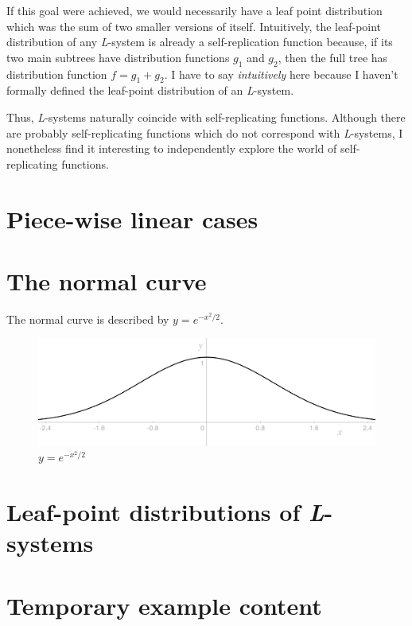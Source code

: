 \documentclass[]{article}
\begin{document}
If this goal were achieved, we would necessarily have a leaf point
distribution which was the sum of two smaller versions of itself.
Intuitively, the leaf-point distribution of any \emph{L}-system is
already a self-replication function because, if its two main subtrees
have distribution functions \(g_1\) and \(g_2\), then the full tree has
distribution function \(f = g_1 + g_2\). I have to say
\emph{intuitively} here because I haven't formally defined the
leaf-point distribution of an \emph{L}-system.

Thus, \emph{L}-systems naturally coincide with self-replicating
functions. Although there are probably self-replicating functions which
do not correspond with \emph{L}-systems, I nonetheless find it
interesting to independently explore the world of self-replicating
functions.

\section{Piece-wise linear cases}\label{piece-wise-linear-cases}

\section{The normal curve}\label{the-normal-curve}

The normal curve is described by \(y = e^{-x^2/2}\).

\begin{figure}[htbp]
\centering
\includegraphics{images/normal@2x.png}
\caption{\(y=e^{-x^2/2}\)}
\end{figure}

\section{\texorpdfstring{Leaf-point distributions of
\emph{L}-systems}{Leaf-point distributions of L-systems}}\label{leaf-point-distributions-of-l-systems}

\section{Temporary example content}\label{temporary-example-content}
\end{document}
